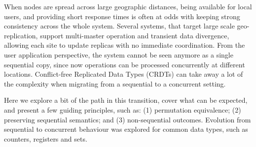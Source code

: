 When nodes are spread across large geographic distances, being available for local users, and providing short response times is often at odds with keeping strong consistency across the whole system. Several systems, that target large scale geo-replication, support multi-master operation and transient data divergence, allowing each site to update replicas with no immediate coordination. From the user application perspective, the system cannot be seen anymore as a single sequential copy, since now operations can be processed concurrently at different locations. Conflict-free Replicated Data Types (CRDTs) can take away a lot of the complexity when migrating from a sequential to a concurrent setting. 

Here we explore a bit of the path in this transition, cover what can be expected, and present a few guiding principles, such as: (1) permutation equivalence; (2) preserving sequential semantics; and (3) non-sequential outcomes. Evolution from sequential to concurrent behaviour was explored for common data types, such as counters, registers and sets. 
